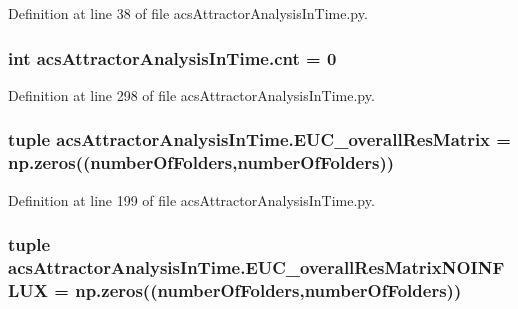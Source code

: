 Definition at line 38 of file acs\-Attractor\-Analysis\-In\-Time.\-py.

\hypertarget{a00123_aabada0bdbcd7fb71d37a9310d32f0a28}{
\subsubsection[{cnt}]{\setlength{\rightskip}{0pt plus 5cm}int acs\-Attractor\-Analysis\-In\-Time.\-cnt = 0}}\label{a00123_aabada0bdbcd7fb71d37a9310d32f0a28}


Definition at line 298 of file acs\-Attractor\-Analysis\-In\-Time.\-py.

\hypertarget{a00123_a63ee1925f76a40d04495e9b35c0973d2}{
\subsubsection[{E\-U\-C\-\_\-overall\-Res\-Matrix}]{\setlength{\rightskip}{0pt plus 5cm}tuple acs\-Attractor\-Analysis\-In\-Time.\-E\-U\-C\-\_\-overall\-Res\-Matrix = np.\-zeros(({\bf number\-Of\-Folders},{\bf number\-Of\-Folders}))}}\label{a00123_a63ee1925f76a40d04495e9b35c0973d2}


Definition at line 199 of file acs\-Attractor\-Analysis\-In\-Time.\-py.

\hypertarget{a00123_a4f2ecc559d2c5d79bb138a2e8ced8127}{
\subsubsection[{E\-U\-C\-\_\-overall\-Res\-Matrix\-N\-O\-I\-N\-F\-L\-U\-X}]{\setlength{\rightskip}{0pt plus 5cm}tuple acs\-Attractor\-Analysis\-In\-Time.\-E\-U\-C\-\_\-overall\-Res\-Matrix\-N\-O\-I\-N\-F\-L\-U\-X = np.\-zeros(({\bf number\-Of\-Folders},{\bf number\-Of\-Folders}))}}\label{a00123_a4f2ecc559d2c5d79bb138a2e8ced8127}


